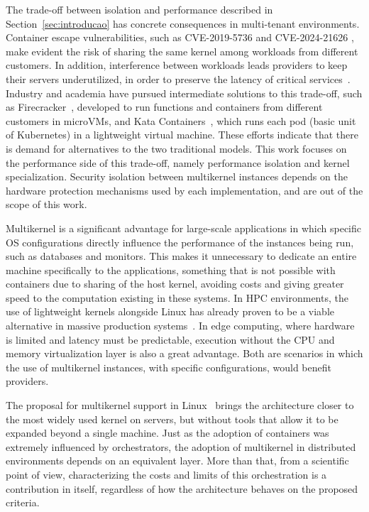 \documentclass[12pt]{article}
\begin{document}
The trade-off between isolation and performance described in Section~\ref{sec:introducao} has concrete consequences in
multi-tenant environments.
Container escape vulnerabilities, such as CVE-2019-5736 and CVE-2024-21626 \cite{cve20195736,cve202421626},
make evident the risk of sharing the same kernel among workloads from different customers.
In addition, interference between workloads leads providers to keep their servers underutilized, in order to
preserve the latency of critical services~\cite{lo2015heracles}.
Industry and academia have pursued intermediate solutions to this trade-off, such as Firecracker~\cite{agache2020firecracker}, developed to run functions and
containers from different customers in microVMs, and Kata Containers~\cite{katacontainers}, which runs each pod (basic unit of Kubernetes)
in a lightweight virtual machine.
These efforts indicate that there is demand for alternatives to the two traditional models.
This work focuses on the performance side of this trade-off, namely performance isolation and kernel specialization.
Security isolation between multikernel instances depends on the hardware protection mechanisms used by each implementation,
and are out of the scope of this work.

Multikernel is a significant advantage for large-scale applications in which specific OS configurations
directly influence the performance of the instances being run, such as databases and monitors.
This makes it unnecessary to dedicate an entire machine specifically to the applications, something that is not possible
with containers due to sharing of the host kernel, avoiding costs and giving greater speed to the
computation existing in these systems.
In HPC environments, the use of lightweight kernels alongside Linux has already proven to be a viable alternative in massive production systems~\cite{gerofi2016mckernel}.
In edge computing, where hardware is limited and latency must be predictable, execution without the CPU and memory virtualization layer is also
a great advantage.
Both are scenarios in which the use of multikernel instances, with specific configurations, would benefit providers.

The proposal for multikernel support in Linux~\cite{wang2025multikernel} brings the architecture closer
to the most widely used kernel on servers, but without tools that allow it to be expanded beyond a single machine.
Just as the adoption of containers was extremely influenced by orchestrators, the adoption of multikernel in distributed environments depends on an
equivalent layer.
More than that, from a scientific point of view, characterizing the costs and limits of this orchestration is a contribution
in itself, regardless of how the architecture behaves on the proposed criteria.
\end{document}
